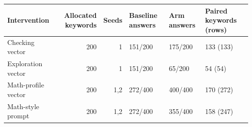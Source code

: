 \begin{tabular}{lrrlll}
\toprule Intervention & Allocated keywords & Seeds & Baseline answers & Arm answers & Paired keywords (rows) \\
\midrule
Checking vector & 200 & 1 & 151/200 & 175/200 & 133 (133) \\
Exploration vector & 200 & 1 & 151/200 & 65/200 & 54 (54) \\
Math-profile vector & 200 & 1,2 & 272/400 & 400/400 & 170 (272) \\
Math-style prompt & 200 & 1,2 & 272/400 & 355/400 & 158 (247) \\
\bottomrule
\end{tabular}
